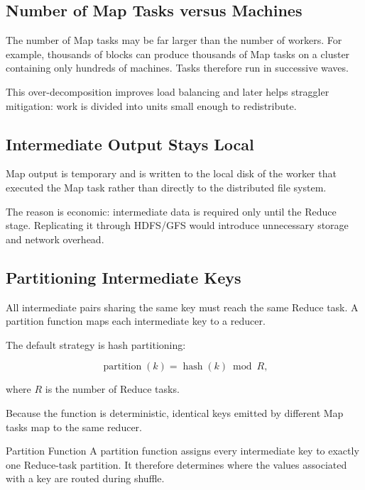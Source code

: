 \documentclass[11pt,a4paper,oneside]{book}
\begin{document}
\subsection{Number of Map Tasks versus Machines}

The number of Map tasks may be far larger than the number of workers. For example, thousands of blocks can produce thousands of Map tasks on a cluster containing only hundreds of machines. Tasks therefore run in successive waves.

This over-decomposition improves load balancing and later helps straggler mitigation: work is divided into units small enough to redistribute.

\subsection{Intermediate Output Stays Local}

Map output is temporary and is written to the local disk of the worker that executed the Map task rather than directly to the distributed file system.

The reason is economic: intermediate data is required only until the Reduce stage. Replicating it through HDFS/GFS would introduce unnecessary storage and network overhead.

\subsection{Partitioning Intermediate Keys}

All intermediate pairs sharing the same key must reach the same Reduce task. A partition function maps each intermediate key to a reducer.

The default strategy is hash partitioning:

\begin{equation}
\operatorname{partition}(k)
=
\operatorname{hash}(k)
\bmod R,
\label{eq:partition}
\end{equation}

where \(R\) is the number of Reduce tasks.

Because the function is deterministic, identical keys emitted by different Map tasks map to the same reducer.

\begin{definitionbox}{Partition Function}
A partition function assigns every intermediate key to exactly one Reduce-task partition. It therefore determines where the values associated with a key are routed during shuffle.
\end{definitionbox}
\end{document}
